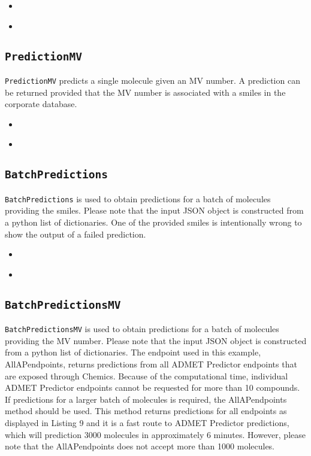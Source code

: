 \documentclass{article}
\newcommand{\insertcode}[2]{\begin{itemize}\item[]\end{itemize}} %
\begin{document}
\insertcode{"Scripts/testPrediction.py"}{Calling the \texttt{prediction} method.} %
\insertcode{"Scripts/testPredictionResult.txt"}{Output of the \texttt{prediction} method.} %


\subsection{\texttt{PredictionMV}}
\texttt{PredictionMV} predicts a single molecule given an MV number. A prediction can be returned provided that the MV number is associated with a smiles in the corporate database.  

\insertcode{"Scripts/testPredictionMV.py"}{Calling the \texttt{predictionMV} method.} %
\insertcode{"Scripts/testPredictionMV.txt"}{Output of the \texttt{predictionMV} method.} %


\subsection{\texttt{BatchPredictions}}
\texttt{BatchPredictions} is used to obtain predictions for a batch of molecules providing the smiles. Please note that the input JSON object is constructed from a python list of dictionaries. 
One of the provided smiles is intentionally wrong to show the output of a failed prediction. 

\insertcode{"Scripts/testBatchPrediction.py"}{Calling the \texttt{batchPrediction} method.} %
\insertcode{"Scripts/testBatchPrediction.txt"}{Output of the \texttt{batchPrediction} method.} %


\subsection{\texttt{BatchPredictionsMV}}
\texttt{BatchPredictionsMV} is used to obtain predictions for a batch of molecules providing the MV number. Please note that the input JSON object is constructed from a python list of dictionaries. The endpoint used in this example, AllAPendpoints, returns predictions from all ADMET Predictor endpoints that are exposed through Chemics. Because of the computational time, individual ADMET Predictor endpoints cannot be requested for more than 10 compounds. If predictions for a larger batch of molecules is required, the AllAPendpoints method should be used. This method returns predictions for all endpoints as displayed in Listing 9 and it is a fast route to ADMET Predictor predictions, which will prediction 3000 molecules in approximately 6 minutes. However, please note that the AllAPendpoints does not accept more than 1000 molecules. 
\end{document}
